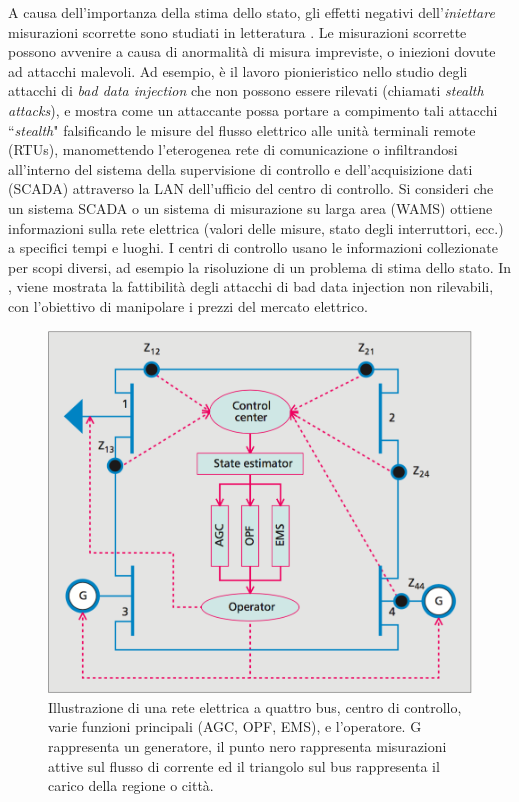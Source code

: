 A causa dell'importanza della stima dello stato, gli effetti negativi dell'\emph{iniettare} misurazioni scorrette sono studiati in letteratura \cite{baddatainj}.  Le misurazioni scorrette possono avvenire a causa di anormalità di misura impreviste, o iniezioni dovute ad attacchi malevoli. Ad esempio, \cite{falsedatainj} è il lavoro pionieristico nello studio degli attacchi di \emph{bad data injection} che non possono essere rilevati (chiamati \emph{stealth attacks}), e mostra come un attaccante possa portare a compimento tali attacchi ``\emph{stealth}" falsificando le misure del flusso elettrico alle unità terminali remote (RTUs), manomettendo l'eterogenea rete di comunicazione o infiltrandosi all'interno del sistema della supervisione di controllo e dell'acquisizione dati (SCADA) attraverso la LAN dell'ufficio del centro di controllo. Si consideri che un sistema SCADA o un sistema di misurazione su larga area (WAMS) ottiene informazioni sulla rete elettrica (valori delle misure, stato degli interruttori, ecc.) a specifici tempi e luoghi. I centri di controllo usano le informazioni collezionate per scopi diversi, ad esempio la risoluzione di un problema di stima dello stato. In \cite{baddatainj2}, viene mostrata la fattibilità degli  attacchi di bad data injection non rilevabili, con l'obiettivo di manipolare i prezzi del mercato elettrico.
\begin{figure}[h]
	\centering
	\includegraphics[scale=.3]{imgs/attack/fourbuspowernet.png}
	\caption{Illustrazione di una rete elettrica a quattro bus, centro di controllo, varie funzioni principali (AGC, OPF, EMS), e l'operatore. G rappresenta un generatore, il punto nero rappresenta misurazioni attive sul flusso di corrente ed il triangolo sul bus rappresenta il carico della regione o città.}
	\label{fourbuspowernet_img}
\end{figure}

